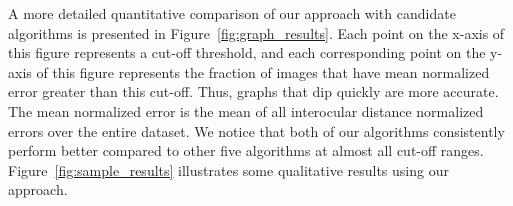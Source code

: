 A more detailed quantitative comparison of our approach with candidate algorithms is
presented in Figure~\ref{fig:graph_results}.
Each point on the x-axis of this figure represents a cut-off threshold, and each corresponding
point on the y-axis of this figure represents the fraction of images that have 
mean normalized error greater than this cut-off. Thus, graphs that dip quickly are 
more accurate.
The mean normalized error is the mean of all interocular distance
normalized errors over the entire dataset. 
We notice that both of our algorithms consistently perform better 
compared to other five algorithms at almost all cut-off ranges.
Figure~\ref{fig:sample_results} illustrates some qualitative results using our approach.

